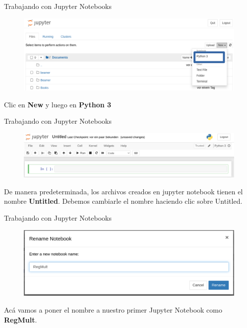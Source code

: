 \documentclass{beamer}
\begin{document}
\begin{frame}{Trabajando con Jupyter Notebooks}
\begin{figure}
\includegraphics[width=1\textwidth]{jupyter.png}
 \end{figure}
Clic en \textbf{New} y luego en \textbf{Python 3}
\end{frame}

\begin{frame}{Trabajando con Jupyter Notebooks}
\begin{figure}
\includegraphics[width=1\textwidth]{JN.png}
\end{figure}
De manera predeterminada, los archivos creados en jupyter notebook tienen el nombre \textbf{Untitled}. Debemos cambiarle el nombre haciendo clic sobre Untitled.
\end{frame}

\begin{frame}{Trabajando con Jupyter Notebooks}
\begin{figure}
\includegraphics[width=1\textwidth]{rename.png}
\end{figure}
Acá vamos a poner el nombre a nuestro primer Jupyter Notebook como \textbf{RegMult}.
\end{frame}
\end{document}

